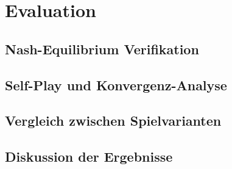 \chapter{Evaluation}

\section{Nash-Equilibrium Verifikation}

\section{Self-Play und Konvergenz-Analyse}

\section{Vergleich zwischen Spielvarianten}

\section{Diskussion der Ergebnisse}


